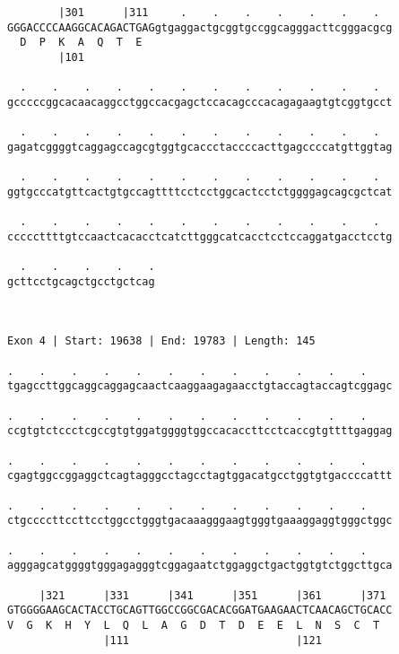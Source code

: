 \documentclass{article}
\begin{document}
\begin{Verbatim}
        |301      |311     .    .    .    .    .    .    .  
GGGACCCCAAGGCACAGACTGAGgtgaggactgcggtgccggcagggacttcgggacgcg
  D  P  K  A  Q  T  E                                       
        |101                                                
  
  .    .    .    .    .    .    .    .    .    .    .    .  
gcccccggcacaacaggcctggccacgagctccacagcccacagagaagtgtcggtgcct
                                                            
  .    .    .    .    .    .    .    .    .    .    .    .  
gagatcggggtcaggagccagcgtggtgcaccctaccccacttgagccccatgttggtag
                                                            
  .    .    .    .    .    .    .    .    .    .    .    .  
ggtgcccatgttcactgtgccagttttcctcctggcactcctctggggagcagcgctcat
                                                            
  .    .    .    .    .    .    .    .    .    .    .    .  
cccccttttgtccaactcacacctcatcttgggcatcacctcctccaggatgacctcctg
                                                            
  .    .    .    .    .
gcttcctgcagctgcctgctcag
                       
                       
 
Exon 4 | Start: 19638 | End: 19783 | Length: 145
 
.    .    .    .    .    .    .    .    .    .    .    .    
tgagccttggcaggcaggagcaactcaaggaagagaacctgtaccagtaccagtcggagc
                                                            
.    .    .    .    .    .    .    .    .    .    .    .    
ccgtgtctccctcgccgtgtggatggggtggccacaccttcctcaccgtgttttgaggag
                                                            
.    .    .    .    .    .    .    .    .    .    .    .    
cgagtggccggaggctcagtagggcctagcctagtggacatgcctggtgtgaccccattt
                                                            
.    .    .    .    .    .    .    .    .    .    .    .    
ctgccccttccttcctggcctgggtgacaaagggaagtgggtgaaaggaggtgggctggc
                                                            
.    .    .    .    .    .    .    .    .    .    .    .    
agggagcatggggtgggagagggtcggagaatctggaggctgactggtgtctggcttgca
                                                            
     |321      |331      |341      |351      |361      |371 
GTGGGGAAGCACTACCTGCAGTTGGCCGGCGACACGGATGAAGAACTCAACAGCTGCACC
V  G  K  H  Y  L  Q  L  A  G  D  T  D  E  E  L  N  S  C  T  
               |111                          |121           
  

\end{Verbatim}
\end{document}
